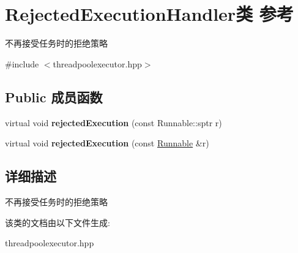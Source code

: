 \hypertarget{classRejectedExecutionHandler}{}\section{Rejected\+Execution\+Handler类 参考}
\label{classRejectedExecutionHandler}


不再接受任务时的拒绝策略  




{\ttfamily \#include $<$threadpoolexecutor.\+hpp$>$}

\subsection*{Public 成员函数}
\begin{DoxyCompactItemize}
\item 
\mbox{\label{classRejectedExecutionHandler_a18d3240b63ffa8a84fa728f89c2ef1d1}} 
virtual void {\bfseries rejected\+Execution} (const Runnable\+::sptr r)
\item 
\mbox{\label{classRejectedExecutionHandler_abb6476c7d64a7bd3111fc1a39829858b}} 
virtual void {\bfseries rejected\+Execution} (const \hyperlink{classRunnable}{Runnable} \&r)
\end{DoxyCompactItemize}


\subsection{详细描述}
不再接受任务时的拒绝策略 

该类的文档由以下文件生成\+:\begin{DoxyCompactItemize}
\item 
threadpoolexecutor.\+hpp\end{DoxyCompactItemize}
